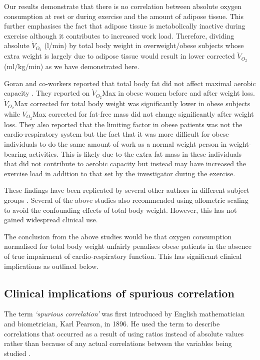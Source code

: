 Our results demonstrate that there is no correlation between absolute oxygen consumption at rest or during exercise and the amount of adipose tissue. 
This further emphasises the fact that adipose tissue is metabolically inactive during exercise although it contributes to increased work load. 
Therefore, dividing absolute $\dot{V}_{O_2}$ (l/min) by total body weight in overweight/obese subjects whose extra weight is largely due to adipose tissue would result in lower corrected $\dot{V}_{O_2}$ (ml/kg/min) as we have demonstrated here. 

Goran and co-workers reported that total body fat did not affect maximal aerobic capacity \parencite{goran_total_2000}. 
They reported on $\dot{V}_{O_2}$Max in obese women before and after weight loss. 
$\dot{V}_{O_2}$Max corrected for total body weight was significantly lower in obese subjects while $\dot{V}_{O_2}$Max corrected for fat-free mass did not change significantly after weight loss. 
They also reported that the limiting factor in obese patients was not the cardio-respiratory system but the fact that it was more difficult for obese individuals to do the same amount of work as a normal weight person in weight-bearing activities. 
This is likely due to the extra fat mass in these individuals that did not contribute to aerobic capacity but instead may have increased the exercise load in addition to that set by the investigator during the exercise.

These findings have been replicated by several other authors in different subject groups \parencite{loftin_scaling_2001, lemaitre_maximum_2006, savonen_current_2012, krachler_cardiopulmonary_2014}. 
Several of the above studies also recommended using allometric scaling to avoid the confounding effects of total body weight. 
However, this has not gained widespread clinical use.

The conclusion from the above studies would be that oxygen consumption normalised for total body weight unfairly penalises obese patients in the absence of true impairment of cardio-respiratory function. 
This has significant clinical implications as outlined below.

\subsection{Clinical implications of spurious correlation}

The term \textit{`spurious correlation'} was first introduced by English mathematician and biometrician, Karl Pearson, in 1896. 
He used the term to describe correlations that occurred as a result of using ratios instead of absolute values rather than because of any actual correlations between the variables being studied \parencite{pearson_mathematical_1896}.

